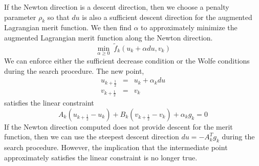 If the Newton direction is a descent direction, then we choose a 
penalty parameter $\rho_k$ so that $du$ is also a sufficient descent 
direction for the augmented Lagrangian merit function.  We 
then find $\alpha$ to approximately minimize the augmented 
Lagrangian merit function along the Newton direction.
\[
\displaystyle \min_{\alpha \geq 0} \; \tilde{f}_k(u_k + \alpha du, v_k)
\]
We can enforce either the sufficient decrease condition or the 
Wolfe conditions during the search procedure.  The new point, 
\[
\begin{array}{lcl}
u_{k+\frac{1}{2}} & = & u_k + \alpha_k du \\
v_{k+\frac{1}{2}} & = & v_k
\end{array}
\]
satisfies the linear constraint
\[
A_k (u_{k+\frac{1}{2}} - u_k) + B_k (v_{k+\frac{1}{2}} - v_k) + \alpha_k g_k = 0
\]
If the Newton direction computed does not provide descent for the merit 
function, then we can use the steepest descent direction $du = -A_k^T g_k$ 
during the search procedure.  However, the implication that the intermediate
point approximately satisfies the linear constraint is no longer true.

